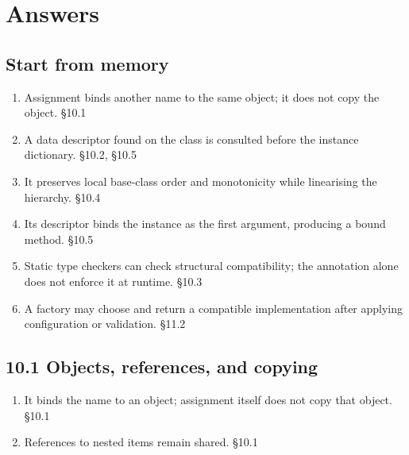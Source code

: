 \documentclass[11pt]{article}
\begin{document}
\section{Answers}
\begin{keepsection}\subsection{Start from memory}

\begin{enumerate}
\item Assignment binds another name to the same object; it does not copy the object. \hfill{\small\color{FAUblue}§10.1}
\item A data descriptor found on the class is consulted before the instance dictionary. \hfill{\small\color{FAUblue}§10.2, §10.5}
\item It preserves local base-class order and monotonicity while linearising the hierarchy. \hfill{\small\color{FAUblue}§10.4}
\item Its descriptor binds the instance as the first argument, producing a bound method. \hfill{\small\color{FAUblue}§10.5}
\item Static type checkers can check structural compatibility; the annotation alone does not enforce it at runtime. \hfill{\small\color{FAUblue}§10.3}
\item A factory may choose and return a compatible implementation after applying configuration or validation. \hfill{\small\color{FAUblue}§11.2}
\end{enumerate}

\end{keepsection}
\begin{keepsection}\subsection{10.1 Objects, references, and copying}

\begin{enumerate}
\item It binds the name to an object; assignment itself does not copy that object. \hfill{\small\color{FAUblue}§10.1}
\item References to nested items remain shared. \hfill{\small\color{FAUblue}§10.1}
\end{enumerate}

\end{keepsection}
\end{document}
